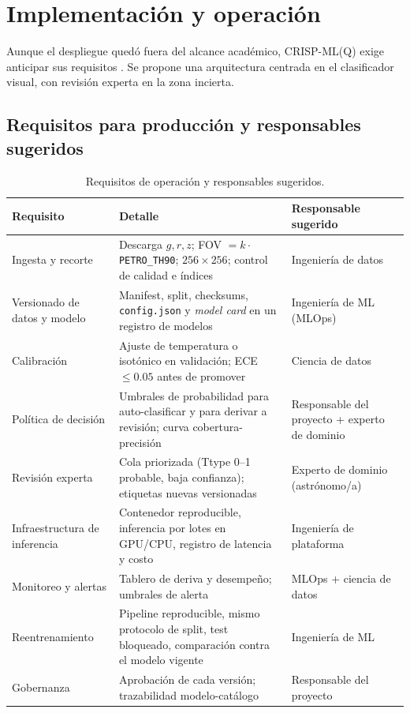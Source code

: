 \section{Implementación y operación}
\label{sec:implementacion}

Aunque el despliegue quedó fuera del alcance académico, CRISP-ML(Q) exige anticipar sus requisitos \citep{studer2021}. Se propone una arquitectura centrada en el clasificador visual, con revisión experta en la zona incierta.

\subsection{Requisitos para producción y responsables sugeridos}

\begin{table}[htbp]
\centering
\caption{Requisitos de operación y responsables sugeridos.}
\label{tab:requisitos}
\small
\begin{tabularx}{\textwidth}{p{3.6cm}Yp{3.2cm}}
\toprule
\textbf{Requisito} & \textbf{Detalle} & \textbf{Responsable sugerido}\\
\midrule
Ingesta y recorte & Descarga $g,r,z$; FOV $=k\cdot$\texttt{PETRO\_TH90}; $256\times256$; control de calidad e índices & Ingeniería de datos\\
Versionado de datos y modelo & Manifest, split, checksums, \texttt{config.json} y \emph{model card} en un registro de modelos & Ingeniería de ML (MLOps)\\
Calibración & Ajuste de temperatura o isotónico en validación; ECE $\leq 0.05$ antes de promover & Ciencia de datos\\
Política de decisión & Umbrales de probabilidad para auto-clasificar y para derivar a revisión; curva cobertura-precisión & Responsable del proyecto + experto de dominio\\
Revisión experta & Cola priorizada (Ttype 0--1 probable, baja confianza); etiquetas nuevas versionadas & Experto de dominio (astrónomo/a)\\
Infraestructura de inferencia & Contenedor reproducible, inferencia por lotes en GPU/CPU, registro de latencia y costo & Ingeniería de plataforma\\
Monitoreo y alertas & Tablero de deriva y desempeño; umbrales de alerta & MLOps + ciencia de datos\\
Reentrenamiento & Pipeline reproducible, mismo protocolo de split, test bloqueado, comparación contra el modelo vigente & Ingeniería de ML\\
Gobernanza & Aprobación de cada versión; trazabilidad modelo-catálogo & Responsable del proyecto\\
\bottomrule
\end{tabularx}
\end{table}

